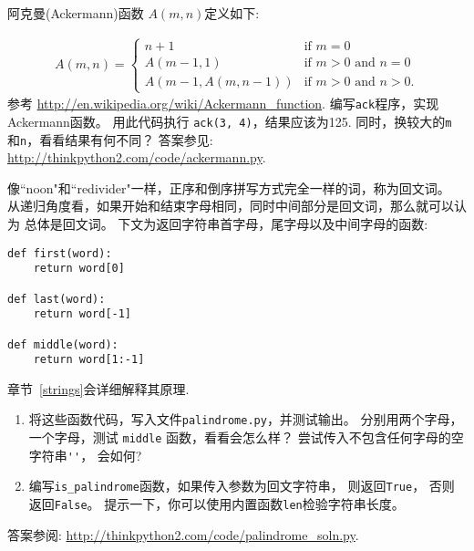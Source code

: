 \documentclass[10pt]{book}
\begin{document}
\begin{exercise}
\label{ackermann}

阿克曼(Ackermann)函数 $A(m, n)$定义如下:

\begin{eqnarray*}
A(m, n) = \begin{cases} 
              n+1 & \mbox{if } m = 0 \\ 
        A(m-1, 1) & \mbox{if } m > 0 \mbox{ and } n = 0 \\ 
A(m-1, A(m, n-1)) & \mbox{if } m > 0 \mbox{ and } n > 0.
\end{cases} 
\end{eqnarray*}
%
参考 \url{http://en.wikipedia.org/wiki/Ackermann_function}.
编写{\tt ack}程序，实现Ackermann函数。
用此代码执行 {\tt ack(3, 4)}，结果应该为125. 
同时，换较大的{\tt m} 和{\tt n}，看看结果有何不同？
答案参见: \url{http://thinkpython2.com/code/ackermann.py}.

\end{exercise}


\begin{exercise}
\label{palindrome}

像``noon"和``redivider"一样，正序和倒序拼写方式完全一样的词，称为回文词。
从递归角度看，如果开始和结束字母相同，同时中间部分是回文词，那么就可以认为
总体是回文词。
下文为返回字符串首字母，尾字母以及中间字母的函数:

\begin{verbatim}
def first(word):
    return word[0]

def last(word):
    return word[-1]

def middle(word):
    return word[1:-1]
\end{verbatim}
%

章节~\ref{strings}会详细解释其原理.

\begin{enumerate}

\item 将这些函数代码，写入文件{\tt palindrome.py}，并测试输出。
分别用两个字母，一个字母，测试 {\tt middle} 函数，看看会怎么样？
尝试传入不包含任何字母的空字符串\verb"''"， 会如何?

\item 编写\verb"is_palindrome"函数，如果传入参数为回文字符串，
则返回{\tt True}， 否则返回{\tt False}。
提示一下，你可以使用内置函数{\tt len}检验字符串长度。

\end{enumerate}

答案参阅: \url{http://thinkpython2.com/code/palindrome_soln.py}.

\end{exercise}
\end{document}
